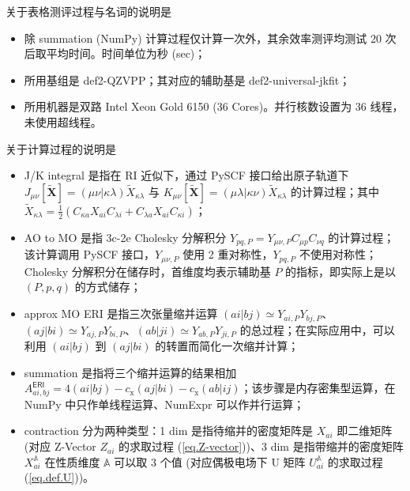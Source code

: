 \begin{table}[h]
  \raggedright
   关于表格测评过程与名词的说明是
  \begin{itemize}[nosep]
    \item 除 summation (NumPy) 计算过程仅计算一次外，其余效率测评均测试 20 次后取平均时间。时间单位为秒 (sec)；
    \item 所用基组是 def2-QZVPP；其对应的辅助基是 def2-universal-jkfit；
    \item 所用机器是双路 Intel Xeon Gold 6150 (36 Cores)。并行核数设置为 36 线程，未使用超线程。
  \end{itemize}
   关于计算过程的说明是
  \begin{itemize}[nosep]
    \item J/K integral 是指在 RI 近似下，通过 PySCF 接口给出原子轨道下 $J_{\mu \nu} [\tilde{\mathbf{X}}] = (\mu \nu | \kappa \lambda) \tilde X_{\kappa \lambda}$ 与 $K_{\mu \nu} [\tilde{\mathbf{X}}] = (\mu \lambda | \kappa \nu) \tilde X_{\kappa \lambda}$ 的计算过程；其中 $\tilde{X}_{\kappa \lambda} = \frac{1}{2} (C_{\kappa a} X_{ai} C_{\lambda i} + C_{\lambda a} X_{ai} C_{\kappa i})$；
    \item AO to MO 是指 3c-2e Cholesky 分解积分 $Y_{pq, P} = Y_{\mu \nu, P} C_{\mu p} C_{\nu q}$ 的计算过程；该计算调用 PySCF 接口，$Y_{\mu \nu, P}$ 使用 2 重对称性，$Y_{pq, P}$ 不使用对称性；Cholesky 分解积分在储存时，首维度均表示辅助基 $P$ 的指标，即实际上是以 $(P, p, q)$ 的方式储存；
    \item approx MO ERI 是指三次张量缩并运算 $(ai|bj) \simeq Y_{ai, P} Y_{bj, P}$、$(aj|bi) \simeq Y_{aj, P} Y_{bi, P}$、$(ab|ji) \simeq Y_{ab, P} Y_{ji, P}$ 的总过程；在实际应用中，可以利用 $(ai|bj)$ 到 $(aj|bi)$ 的转置而简化一次缩并计算；
    \item summation 是指将三个缩并运算的结果相加 $A_{ai, bj}^\textsf{ERI} = 4 (ai | bj) - c_\mathrm{x} (aj | bi) - c_\mathrm{x} (ab | ij)$；该步骤是内存密集型运算，在 NumPy 中只作单线程运算、NumExpr 可以作并行运算；
    \item contraction 分为两种类型：1 dim 是指待缩并的密度矩阵是 $X_{ai}$ 即二维矩阵 (对应 Z-Vector $Z_{ai}$ 的求取过程 (\ref{eq.Z-vector}))、3 dim 是指带缩并的密度矩阵 $X_{ai}^\mathbb{A}$ 在性质维度 $\mathbb{A}$ 可以取 3 个值 (对应偶极电场下 U 矩阵 $U_{ai}^\mathbb{A}$ 的求取过程(\ref{eq.def.U}))。
  \end{itemize}
\end{table}


